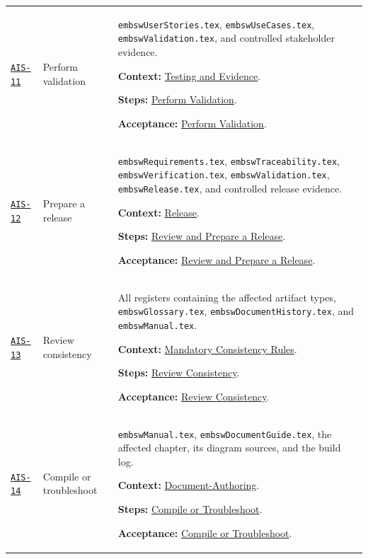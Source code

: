 \begin{tabularx}{\linewidth}{L{1.6cm}L{3.1cm}Y}
\label{Skill:AIS-11}\hyperref[Section:AIValidationSteps]{\texttt{AIS-11}} & Perform validation & \texttt{embswUserStories.tex}, \texttt{embswUseCases.tex}, \texttt{embswValidation.tex}, and controlled stakeholder evidence.\par\textbf{Context:} \hyperref[Section:AITestingContext]{Testing and Evidence}.\par\textbf{Steps:} \hyperref[Section:AIValidationTaskSteps]{Perform Validation}.\par\textbf{Acceptance:} \hyperref[Section:AIValidationAcceptance]{Perform Validation}.\\
\label{Skill:AIS-12}\hyperref[Section:AIReleaseSteps]{\texttt{AIS-12}} & Prepare a release & \texttt{embswRequirements.tex}, \texttt{embswTraceability.tex}, \texttt{embswVerification.tex}, \texttt{embswValidation.tex}, \texttt{embswRelease.tex}, and controlled release evidence.\par\textbf{Context:} \hyperref[Section:AIReleaseContext]{Release}.\par\textbf{Steps:} \hyperref[Section:AIReleaseTaskSteps]{Review and Prepare a Release}.\par\textbf{Acceptance:} \hyperref[Section:AIReleaseAcceptance]{Review and Prepare a Release}.\\
\label{Skill:AIS-13}\hyperref[Section:AIConsistencySteps]{\texttt{AIS-13}} & Review consistency & All registers containing the affected artifact types, \texttt{embswGlossary.tex}, \texttt{embswDocumentHistory.tex}, and \texttt{embswManual.tex}.\par\textbf{Context:} \hyperref[Section:AIConsistencyRules]{Mandatory Consistency Rules}.\par\textbf{Steps:} \hyperref[Section:AIConsistencyTaskSteps]{Review Consistency}.\par\textbf{Acceptance:} \hyperref[Section:AIConsistencyAcceptance]{Review Consistency}.\\
\label{Skill:AIS-14}\hyperref[Section:AIBuildSteps]{\texttt{AIS-14}} & Compile or troubleshoot & \texttt{embswManual.tex}, \texttt{embswDocumentGuide.tex}, the affected chapter, its diagram sources, and the build log.\par\textbf{Context:} \hyperref[Section:AIDocumentContext]{Document-Authoring}.\par\textbf{Steps:} \hyperref[Section:AIBuildTaskSteps]{Compile or Troubleshoot}.\par\textbf{Acceptance:} \hyperref[Section:AIBuildAcceptance]{Compile or Troubleshoot}.\\
\end{tabularx}
\normalsize

